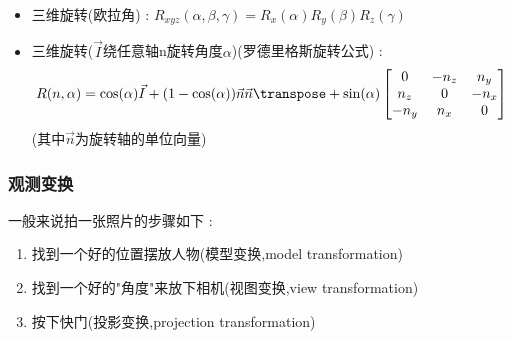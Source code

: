 {{{\begin{itemize}
              $$
                R_y(\alpha) = \begin{bmatrix}
                  \cos\alpha  & 0 & \sin\alpha & 0 \\
                  0           & 1 & 0          & 0 \\
                  -\sin\alpha & 0 & \cos\alpha & 0 \\
                  0           & 0 & 0          & 1
                \end{bmatrix}
              $$

              $$
                R_z(\alpha) = \begin{bmatrix}
                  \cos\alpha & -\sin\alpha & 0 & 0 \\
                  \sin\alpha & \cos\alpha  & 0 & 0 \\
                  0          & 0           & 1 & 0 \\
                  0          & 0           & 0 & 1
                \end{bmatrix}
              $$
        \item 三维旋转(欧拉角) : $R_{xyz}(\alpha,\beta,\gamma) = R_x(\alpha)R_y(\beta)R_z(\gamma)$
        \item 三维旋转($\vec{I}$绕任意轴n旋转角度$\alpha$)(罗德里格斯旋转公式) : $$
                R(n,\alpha) = \cos(\alpha)\vec{I} + (1 - \cos(\alpha))\vec{n}\vec{n}\transpose + \sin(\alpha)\begin{bmatrix}
                  0    & -n_z & n_y  \\
                  n_z  & 0    & -n_x \\
                  -n_y & n_x  & 0
                \end{bmatrix}
              $$
              (其中$\vec{n}$为旋转轴的单位向量)
      \end{itemize}
    }%

    \subsubsection{观测变换}{
      一般来说拍一张照片的步骤如下 :

      \begin{enumerate}
        \item 找到一个好的位置摆放人物(模型变换,model transformation)
        \item 找到一个好的"角度"来放下相机(视图变换,view transformation)
        \item 按下快门(投影变换,projection transformation)
      \end{enumerate}

}}}
